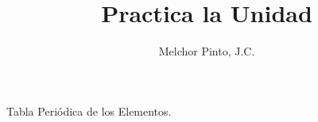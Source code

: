 \documentclass[12pt,addpoints,answers]{repaso}
\title{Practica la Unidad}
\author{Melchor Pinto, J.C.}
\begin{document}
\INFO
\ejemplosboxed[]
\begin{questions}
    \questionboxed[5]{}
    \questionboxed[5]{}

    \begin{multicols}{2}
    \ejemplosboxed[]
    \ejemplosboxed[]
    \end{multicols}
    
    \begin{multicols}{2}
        \questionboxed[5]{}
        \questionboxed[5]{}
    \end{multicols}

    \begin{multicols}{2}
    \questionboxed[5]{}
    \questionboxed[5]{}
    \end{multicols}

    \begin{multicols}{2}
    \questionboxed[5]{}
    \questionboxed[5]{}
    \end{multicols}

    \questionboxed[5]{}
    \questionboxed[10]{}

    \questionboxed[5]{}
    \questionboxed[5]{}
    \questionboxed[5]{}
    \questionboxed[5]{}

    
    \begin{multicols}{2}
    \questionboxed[15]{}
    \questionboxed[5]{}
    \end{multicols}

    \questionboxed[5]{}


\end{questions}
\begin{landscape}
    \begin{minipage}[b]{\textwidth}
        \thispagestyle{foot}
        \begin{table}[H]
            \centering
            \caption{Tabla Peri\'odica de los Elementos.}
            \TablaPeriodica[0.48]
            \label{tab:periodic_table}
        \end{table}
    \end{minipage}
\end{landscape}
\end{document}
